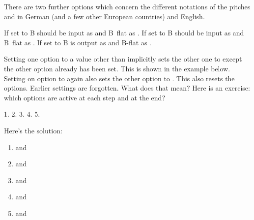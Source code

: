 \documentclass[load-preamble+]{cnltx-doc}
\begin{document}
There are two further options which concern the different notations of the
pitches  and  in German (and a few other European
countries) and English.
\begin{options}
    If set to  B should be input as  and B~flat as
    . If set to  B should be input as  and
    B~flat as .
    If set to  B is output
    as  and B-flat as .
\end{options}
Setting one option to a value other than  implicitly sets the
other one to  except the other option already has been set.
This is shown in the example below.  Setting on option to  again
also sets the other option to .  This also resets the options.
Earlier settings are forgotten.  What does that mean?  Here is an exercise:
which options are active at each step and at the end?
\begin{sourcecode}
  1. 
  2. 
  3. 
  4. 
  5. 
\end{sourcecode}
Here's the solution:
\begin{enumerate}
  \item {} and 
  \item {} and 
  \item {} and 
  \item {} and 
  \item {} and 
\end{enumerate}
\end{document}
